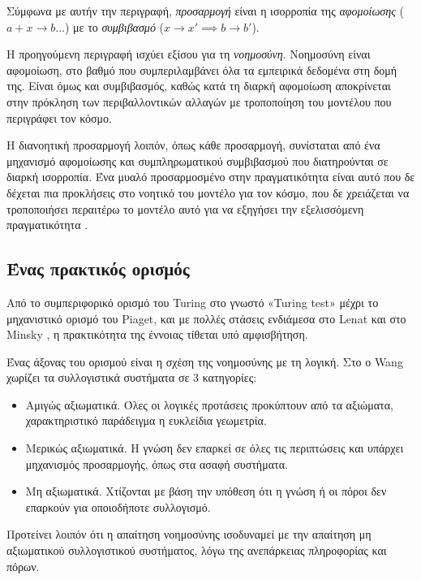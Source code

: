   Σύμφωνα με αυτήν την περιγραφή, \textit{προσαρμογή} είναι η ισορροπία της \textit{αφομοίωσης} ($a+x\rightarrow b$...) με το \textit{συμβιβασμό} ($x\rightarrow x' \implies b\rightarrow b'$).

  Η προηγούμενη περιγραφή ισχύει εξίσου για τη \textit{νοημοσύνη}. Νοημοσύνη είναι αφομοίωση, στο βαθμό που συμπεριλαμβάνει όλα τα εμπειρικά δεδομένα στη δομή της.
  Είναι όμως και συμβιβασμός, καθώς κατά τη διαρκή αφομοίωση αποκρίνεται στην πρόκληση των περιβαλλοντικών αλλαγών με τροποποίηση του μοντέλου που περιγράφει τον κόσμο.

  Η διανοητική προσαρμογή λοιπόν, όπως κάθε προσαρμογή, συνίσταται από ένα μηχανισμό αφομοίωσης και συμπληρωματικού συμβιβασμού που διατηρούνται σε διαρκή ισορροπία.
  Ένα μυαλό προσαρμοσμένο στην πραγματικότητα είναι αυτό που δε δέχεται πια προκλήσεις στο νοητικό του μοντέλο για τον κόσμο,
  που δε χρειάζεται να τροποποιήσει περαιτέρω το μοντέλο αυτό για να εξηγήσει την εξελισσόμενη πραγματικότητα \parencite[σελ 5-7]{piagetOriginsIntelligenceChildren1952}.

\subsection*{Ένας πρακτικός ορισμός}

  Από το συμπεριφορικό ορισμό του Turing στο γνωστό «Turing test» μέχρι το μηχανιστικό ορισμό του Piaget,
  και με πολλές στάσεις ενδιάμεσα στο Lenat \cite{lenatThresholdsKnowledge1991} και στο Minsky \cite{minskySocietyMind1988},
  η πρακτικότητα της έννοιας τίθεται υπό αμφισβήτηση.

  Ένας άξονας του ορισμού είναι η σχέση της νοημοσύνης με τη λογική. Στο \cite{wangCognitiveLogicMathematical}
  ο Wang χωρίζει τα συλλογιστικά συστήματα σε 3 κατηγορίες:
  \begin{itemize}
    \item Αμιγώς αξιωματικά. Όλες οι λογικές προτάσεις προκύπτουν από τα αξιώματα, χαρακτηριστικό παράδειγμα η ευκλείδια γεωμετρία.
    \item Μερικώς αξιωματικά. Η γνώση δεν επαρκεί σε όλες τις περιπτώσεις και υπάρχει μηχανισμός προσαρμογής, όπως στα ασαφή συστήματα.
    \item Μη αξιωματικά. Χτίζονται με βάση την υπόθεση ότι η γνώση ή οι πόροι δεν επαρκούν για οποιοδήποτε συλλογισμό.
  \end{itemize}

  Προτείνει λοιπόν ότι η απαίτηση νοημοσύνης ισοδυναμεί με την απαίτηση μη αξιωματικού συλλογιστικού συστήματος,
  λόγω της ανεπάρκειας πληροφορίας και πόρων.

